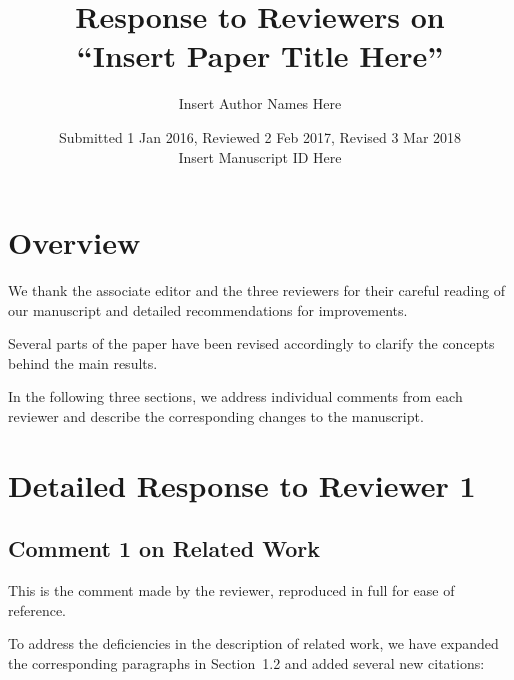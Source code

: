 \documentclass[letterpaper,10pt,twocolumn]{article}
\begin{document}
\pagestyle{plain}

\title{Response to Reviewers on\\
``Insert Paper Title Here''}
\author{Insert Author Names Here}
\date{\normalsize
Submitted 1 Jan 2016,
Reviewed 2 Feb 2017,
Revised 3 Mar 2018\\
Insert Manuscript ID Here}
\maketitle


\section{Overview}

We thank the associate editor and the three reviewers for their careful reading of our manuscript and detailed recommendations for improvements.

Several parts of the paper have been revised accordingly to clarify the concepts behind the main results.
\lipsum[1]

In the following three sections, we address individual comments from each reviewer and describe the corresponding changes to the manuscript.


\section{Detailed Response to Reviewer 1}

\subsection{Comment 1 on Related Work}

\begin{Reviewer1}
This is the comment made by the reviewer, reproduced in full for ease of reference.
\lipsum[2]
\end{Reviewer1}

To address the deficiencies in the description of related work, we have expanded the corresponding paragraphs in Section~1.2 and added several new citations:

\begin{RevisedVersion}
\lipsum[5]
\end{RevisedVersion}
\end{document}
